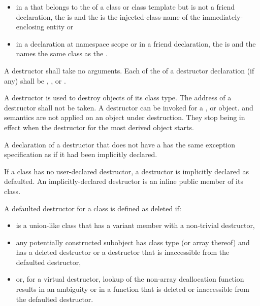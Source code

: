 \begin{itemize}
\item
in a  that belongs to the
 of a class or class template
but is not a friend
declaration, the  is
\tcode{\~} and the  is the
injected-class-name of the immediately-enclosing entity or

\item
in a declaration at namespace scope or in a friend declaration, the
 is 
\tcode{\~} and the  names the
same class as the .
\end{itemize}

A destructor shall take no arguments.
Each  of the 
of a destructor declaration (if any) shall be , , or
.

\pnum
A destructor is used to destroy objects of its class type.
%
The address of a destructor shall not be taken.
%
%
A destructor can be invoked for a
,
or
object.
and
semantics are not applied on an object under destruction.
They stop being in effect when the destructor for the
most derived object starts.

\pnum
\begin{note}
A declaration of a destructor that does not have a 
has the same exception specification as if it had been implicitly declared.
\end{note}

\pnum
{}%
%
If a class has no user-declared
destructor, a destructor is implicitly
declared as defaulted.
An implicitly-declared destructor is an
inline public member of its class.

\pnum
A defaulted destructor for a class
   is defined as deleted if:
\begin{itemize}
\item {} is a union-like class that has a variant
  member with a non-trivial destructor,

\item any potentially constructed subobject has class type
   (or array thereof) and
   has a deleted destructor or a destructor
  that is inaccessible from the defaulted destructor,

\item or, for a virtual destructor, lookup of the non-array deallocation
  function results in an ambiguity or in a function that is deleted or
  inaccessible from the defaulted destructor.
\end{itemize}

